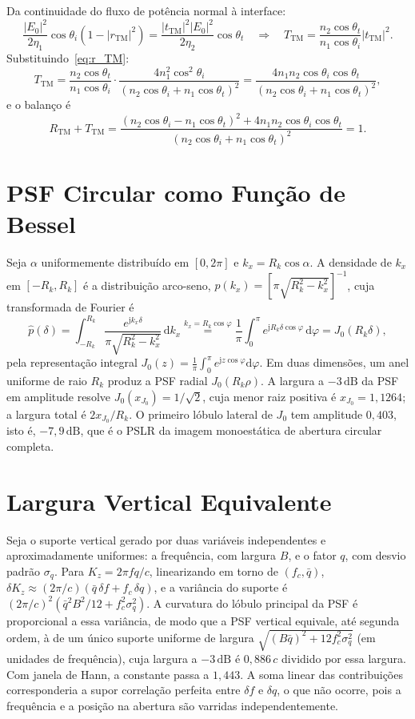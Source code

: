 \documentclass[12pt,a4paper,oneside]{book}
\theoremstyle{remark}
\newcommand{\dd}{\mathrm{d}}
\newcommand{\jj}{\mathrm{j}}
\newcommand{\dB}{\,\mathrm{dB}}
\theoremstyle{plain}
\theoremstyle{definition}
\begin{document}
Da continuidade do fluxo de potência normal à interface:
\[
  \frac{|E_0|^2}{2\eta_1}\cos\theta_i(1-|r_{\text{TM}}|^2)
  = \frac{|t_{\text{TM}}|^2|E_0|^2}{2\eta_2}\cos\theta_t
  \quad\Rightarrow\quad
  T_{\text{TM}} = \frac{n_2\cos\theta_t}{n_1\cos\theta_i}|t_{\text{TM}}|^2 .
\]
Substituindo~\eqref{eq:r_TM}:
\[
  T_{\text{TM}} =
  \frac{n_2\cos\theta_t}{n_1\cos\theta_i}
  \cdot\frac{4n_1^2\cos^2\theta_i}{(n_2\cos\theta_i+n_1\cos\theta_t)^2}
  = \frac{4n_1 n_2\cos\theta_i\cos\theta_t}{(n_2\cos\theta_i+n_1\cos\theta_t)^2},
\]
e o balanço é
\[
  R_{\text{TM}} + T_{\text{TM}} =
  \frac{(n_2\cos\theta_i-n_1\cos\theta_t)^2 + 4n_1 n_2\cos\theta_i\cos\theta_t}
       {(n_2\cos\theta_i+n_1\cos\theta_t)^2} = 1 .
\]

\section{PSF Circular como Função de Bessel}
\label{app:bessel}

Seja $\alpha$ uniformemente distribuído em $[0,2\pi]$ e $k_x = R_k\cos\alpha$. A
densidade de $k_x$ em $[-R_k, R_k]$ é a distribuição arco-seno,
$p(k_x) = [\pi\sqrt{R_k^2-k_x^2}]^{-1}$, cuja transformada de Fourier é
\[
  \hat{p}(\delta) = \int_{-R_k}^{R_k}
  \frac{e^{\jj k_x\delta}}{\pi\sqrt{R_k^2-k_x^2}}\,\dd k_x
  \stackrel{k_x=R_k\cos\varphi}{=}
  \frac{1}{\pi}\int_0^\pi e^{\jj R_k\delta\cos\varphi}\,\dd\varphi
  = J_0(R_k\delta),
\]
pela representação integral $J_0(z) = \frac{1}{\pi}\int_0^\pi e^{\jj z\cos\varphi}\dd\varphi$.
Em duas dimensões, um anel uniforme de raio $R_k$ produz a PSF radial
$J_0(R_k\rho)$. A largura a $-3\dB$ da PSF em amplitude resolve
$J_0(x_{J_0})=1/\sqrt2$, cuja menor raiz positiva é $x_{J_0}=1,1264$; a largura
total é $2x_{J_0}/R_k$. O primeiro lóbulo lateral de $J_0$ tem amplitude $0,403$,
isto é, $-7,9\dB$, que é o PSLR da imagem monoestática de abertura circular
completa.

\section{Largura Vertical Equivalente}
\label{app:dz}

Seja o suporte vertical gerado por duas variáveis independentes e aproximadamente
uniformes: a frequência, com largura $B$, e o fator $q$, com desvio padrão
$\sigma_q$. Para $K_z=2\pi fq/c$, linearizando em torno de $(f_c,\bar q)$,
$\delta K_z\approx(2\pi/c)(\bar q\,\delta f+f_c\,\delta q)$, e a variância do suporte
é $(2\pi/c)^2(\bar q^2B^2/12+f_c^2\sigma_q^2)$. A curvatura do lóbulo principal da
PSF é proporcional a essa variância, de modo que a PSF vertical equivale, até
segunda ordem, à de um único suporte uniforme de largura
$\sqrt{(B\bar q)^2+12f_c^2\sigma_q^2}$ (em unidades de frequência), cuja largura a
$-3\dB$ é $0,886\,c$ dividido por essa largura. Com janela de Hann, a constante
passa a $1,443$. A soma linear das contribuições corresponderia a supor
correlação perfeita entre $\delta f$ e $\delta q$, o que não ocorre, pois a
frequência e a posição na abertura são varridas independentemente.
\end{document}
